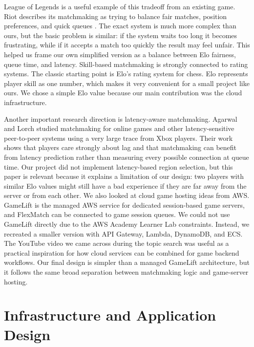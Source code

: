 \documentclass[9pt,a4paper,twocolumn,twoside]{tau-class/tau}
\begin{document}
    League of Legends is a useful example of this tradeoff from an existing game. Riot describes its matchmaking as trying to balance fair matches, position preferences, and quick queues \cite{riotLeagueMatchmaking}. The exact system is much more complex than ours, but the basic problem is similar: if the system waits too long it becomes frustrating, while if it accepts a match too quickly the result may feel unfair. This helped us frame our own simplified version as a balance between Elo fairness, queue time, and latency.
    Skill-based matchmaking is strongly connected to rating systems. The classic starting point is Elo's rating system \cite{elo1978rating} for chess. Elo represents player skill as one number, which makes it very convenient for a small project like ours. 
    We chose a simple Elo value because our main contribution was the cloud infrastructure.

    Another important research direction is latency-aware matchmaking. Agarwal and Lorch \cite{agarwal2009matchmaking} studied matchmaking for online games and other latency-sensitive peer-to-peer systems using a very large trace from Xbox players. Their work shows that players care strongly about lag and that matchmaking can benefit from latency prediction rather than measuring every possible connection at queue time. Our project did not implement latency-based region selection, but this paper is relevant because it explains a limitation of our design: two players with similar Elo values might still have a bad experience if they are far away from the server or from each other.
    We also looked at cloud game hosting ideas from AWS. GameLift is the managed AWS service for dedicated session-based game servers, and FlexMatch can be connected to game session queues. We could not use GameLift directly due to the AWS Academy Learner Lab constraints. Instead, we recreated a smaller version with API Gateway, Lambda, DynamoDB, and ECS. 
    The YouTube video \cite{youtubeMatchmakingVideo} we came across during the topic search was useful as a practical inspiration for how cloud services can be combined for game backend workflows. Our final design is simpler than a managed GameLift architecture, but it follows the same broad separation between matchmaking logic and game-server hosting.

\section{Infrastructure and Application Design}
\end{document}
